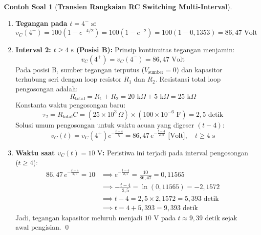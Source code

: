 \documentclass[11pt,a4paper]{article}
\theoremstyle{definition}
\newtheorem{example}{Contoh Soal}[section]
\begin{document}
\begin{example}[\textbf{Transien Rangkaian RC Switching Multi-Interval}]
\begin{enumerate}[label=(\alph*), leftmargin=*]
    \item \textbf{Tegangan pada $t = 4^-\text{ s}$:}
    \begin{equation*}
        v_C(4^-) = 100 \left( 1 - e^{-4/2} \right) = 100 \left( 1 - e^{-2} \right) = 100 \left( 1 - 0{,}1353 \right) = 86{,}47\text{ Volt}
    \end{equation*}

    \item \textbf{Interval 2: $t \ge 4\text{ s}$ (Posisi B):}
    Prinsip kontinuitas tegangan menjamin:
    \begin{equation*}
        v_C(4^+) = v_C(4^-) = 86{,}47\text{ Volt}
    \end{equation*}
    Pada posisi B, sumber tegangan terputus ($V_{\text{sumber}} = 0$) dan kapasitor terhubung seri dengan loop resistor $R_1$ dan $R_2$. Resistansi total loop pengosongan adalah:
    \begin{equation*}
        R_{\text{total}} = R_1 + R_2 = 20\text{ k}\Omega + 5\text{ k}\Omega = 25\text{ k}\Omega
    \end{equation*}
    Konstanta waktu pengosongan baru:
    \begin{equation*}
        \tau_2 = R_{\text{total}} C = (25 \times 10^3\,\Omega) \times (100 \times 10^{-6}\text{ F}) = 2{,}5\text{ detik}
    \end{equation*}
    Solusi umum pengosongan untuk waktu acuan yang digeser $(t - 4)$:
    \begin{equation*}
        v_C(t) = v_C(4^+) e^{-\frac{t - 4}{\tau_2}} = 86{,}47 \, e^{-\frac{t - 4}{2{,}5}}\text{ [Volt]}, \quad t \ge 4\text{ s}
    \end{equation*}

    \item \textbf{Waktu saat $v_C(t) = 10\text{ V}$:}
    Peristiwa ini terjadi pada interval pengosongan ($t \ge 4$):
    \begin{align*}
        86{,}47 \, e^{-\frac{t - 4}{2{,}5}} = 10 &\implies e^{-\frac{t - 4}{2{,}5}} = \frac{10}{86{,}47} = 0{,}11565 \\
        &\implies -\frac{t - 4}{2{,}5} = \ln(0{,}11565) = -2{,}1572 \\
        &\implies t - 4 = 2{,}5 \times 2{,}1572 = 5{,}393\text{ detik} \\
        &\implies t = 4 + 5{,}393 = 9{,}393\text{ detik}
    \end{align*}
    Jadi, tegangan kapasitor meluruh menjadi $10\text{ V}$ pada $t \approx 9{,}39\text{ detik}$ sejak awal pengisian. \qed
\end{enumerate}
\end{example}
\end{document}
